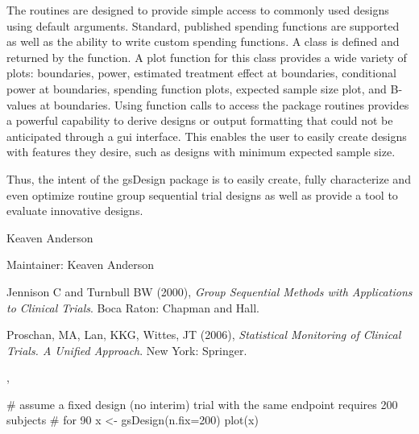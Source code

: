 \begin{Details}
The routines are designed to provide simple access to commonly used designs
using default arguments. 
Standard, published spending functions are supported as well as the ability to write custom spending functions. 
A  class is defined and returned by the  function. 
A plot function for this class provides a wide variety of plots: boundaries, power, estimated treatment effect at boundaries, 
conditional power at boundaries, spending function plots, expected sample size plot, and B-values at boundaries.
Using function calls to access the package routines provides a powerful capability to derive designs or output 
formatting that could not be anticipated through a gui interface. 
This enables the user to easily create designs with features they desire, 
such as designs with minimum expected sample size.

Thus, the intent of the gsDesign package is to easily create, fully characterize and even 
optimize routine group sequential trial designs as well as provide a tool to evaluate innovative designs.
\end{Details}
\begin{Author}\relax
Keaven Anderson

Maintainer: Keaven Anderson 
\end{Author}
\begin{References}\relax
Jennison C and Turnbull BW (2000), \emph{Group Sequential Methods with Applications to Clinical Trials}.
Boca Raton: Chapman and Hall.

Proschan, MA, Lan, KKG, Wittes, JT (2006), \emph{Statistical Monitoring of Clinical Trials. A Unified Approach}. 
New York: Springer.
\end{References}
\begin{SeeAlso}\relax
{}, 
\end{SeeAlso}
\begin{Examples}
\begin{ExampleCode}
# assume a fixed design (no interim) trial with the same endpoint requires 200 subjects
# for 90%
x <- gsDesign(n.fix=200)
plot(x)
\end{ExampleCode}
\end{Examples}

